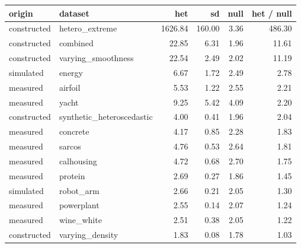 \begin{tabular}{llrrrr}
\toprule
origin & dataset & het & sd & null & het / null \\
\midrule
constructed & hetero\_extreme & 1626.84 & 160.00 & 3.36 & 486.30 \\
constructed & combined & 22.85 & 6.31 & 1.96 & 11.61 \\
constructed & varying\_smoothness & 22.54 & 2.49 & 2.02 & 11.19 \\
simulated & energy & 6.67 & 1.72 & 2.49 & 2.78 \\
measured & airfoil & 5.53 & 1.22 & 2.55 & 2.21 \\
measured & yacht & 9.25 & 5.42 & 4.09 & 2.20 \\
constructed & synthetic\_heteroscedastic & 4.00 & 0.41 & 1.96 & 2.04 \\
measured & concrete & 4.17 & 0.85 & 2.28 & 1.83 \\
measured & sarcos & 4.76 & 0.53 & 2.64 & 1.81 \\
measured & calhousing & 4.72 & 0.68 & 2.70 & 1.75 \\
measured & protein & 2.69 & 0.27 & 1.86 & 1.45 \\
simulated & robot\_arm & 2.66 & 0.21 & 2.05 & 1.30 \\
measured & powerplant & 2.55 & 0.14 & 2.07 & 1.24 \\
measured & wine\_white & 2.51 & 0.38 & 2.05 & 1.22 \\
constructed & varying\_density & 1.83 & 0.08 & 1.78 & 1.03 \\
\bottomrule
\end{tabular}
